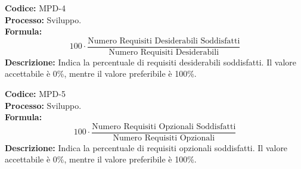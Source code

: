 \textbf{Codice:} MPD-4 \\
\textbf{Processo:} Sviluppo. \\
\textbf{Formula:}
\[
100 \cdot \frac{\text{Numero Requisiti Desiderabili Soddisfatti}}{\text{Numero Requisiti Desiderabili}}
\]
\textbf{Descrizione:} Indica la percentuale di requisiti desiderabili soddisfatti. Il valore accettabile è 0\%, mentre il valore preferibile è 100\%.

\textbf{Codice:} MPD-5 \\
\textbf{Processo:} Sviluppo. \\
\textbf{Formula:}
\[
100 \cdot \frac{\text{Numero Requisiti Opzionali Soddisfatti}}{\text{Numero Requisiti Opzionali}}
\]
\textbf{Descrizione:} Indica la percentuale di requisiti opzionali soddisfatti. Il valore accettabile è 0\%, mentre il valore preferibile è 100\%.